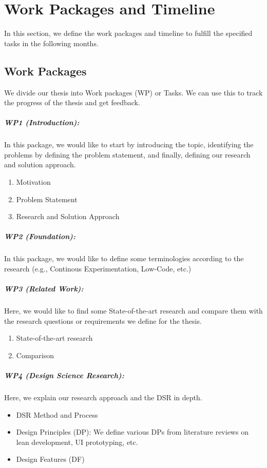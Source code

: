 \chapter{Work Packages and Timeline}
\label{chap:wps}
In this section, we define the work packages and timeline to fulfill the specified tasks in the following months.

\section{Work Packages}
We divide our thesis into Work packages (WP) or Tasks.
We can use this to track the progress of the thesis and get feedback.

\paragraph{WP1 (Introduction):} In this package, we would like to start by introducing the topic, identifying the problems by defining the problem statement, and finally, defining our research and solution approach.
\begin{enumerate}
    \item Motivation
    \item Problem Statement
    \item Research and Solution Approach
\end{enumerate}

\paragraph{WP2 (Foundation):} In this package, we would like to define some terminologies according to the research (e.g., Continous Experimentation, Low-Code, etc.)

\paragraph{WP3 (Related Work):} Here, we would like to find some State-of-the-art research and compare them with the research questions or requirements we define for the thesis.
\begin{enumerate}
    \item State-of-the-art research
    \item Comparison
\end{enumerate}

\paragraph{WP4 (Design Science Research):} Here, we explain our research approach and the DSR in depth.
	\begin{itemize}
		\item DSR Method and Process
		\item Design Principles (DP): We define various DPs from literature reviews on lean development, UI prototyping, etc.
		\item Design Features (DF)
	\end{itemize}

